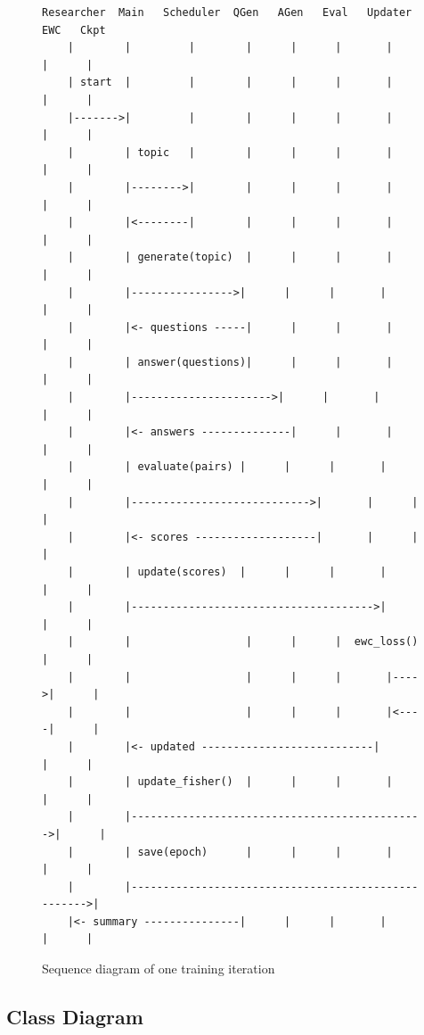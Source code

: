\documentclass[12pt,a4paper]{report}
\begin{document}
\begin{figure}[htbp]
\centering
\begin{verbatim}
Researcher  Main   Scheduler  QGen   AGen   Eval   Updater  EWC   Ckpt
    |        |         |        |      |      |       |      |      |
    | start  |         |        |      |      |       |      |      |
    |------->|         |        |      |      |       |      |      |
    |        | topic   |        |      |      |       |      |      |
    |        |-------->|        |      |      |       |      |      |
    |        |<--------|        |      |      |       |      |      |
    |        | generate(topic)  |      |      |       |      |      |
    |        |---------------->|      |      |       |      |      |
    |        |<- questions -----|      |      |       |      |      |
    |        | answer(questions)|      |      |       |      |      |
    |        |---------------------->|      |       |      |      |
    |        |<- answers --------------|      |       |      |      |
    |        | evaluate(pairs) |      |      |       |      |      |
    |        |---------------------------->|       |      |      |
    |        |<- scores -------------------|       |      |      |
    |        | update(scores)  |      |      |       |      |      |
    |        |-------------------------------------->|      |      |
    |        |                  |      |      |  ewc_loss()  |      |
    |        |                  |      |      |       |---->|      |
    |        |                  |      |      |       |<----|      |
    |        |<- updated ---------------------------|      |      |
    |        | update_fisher()  |      |      |       |      |      |
    |        |---------------------------------------------->|      |
    |        | save(epoch)      |      |      |       |      |      |
    |        |---------------------------------------------------->|
    |<- summary ---------------|      |      |       |      |      |
\end{verbatim}
\caption{Sequence diagram of one training iteration}
\end{figure}

\subsection{Class Diagram}
\end{document}
